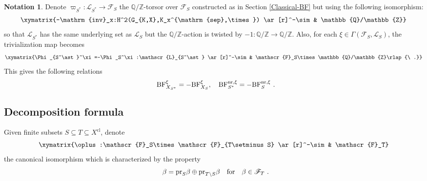 \documentclass[a4paper]{amsart}
\theoremstyle{definition}
\newtheorem{notation}[thm]{Notation}
\numberwithin{equation}{section}
\begin{document}
\begin{notation}\label{Bdy-reversed} Denote $\varpi_{S^\ast}:\mathscr{L}_{S^\ast}\rightarrow\mathscr{F}_S$ the $\mathbb{Q}/\mathbb{Z}$-torsor over $\mathscr{F}_S$ constructed as in Section \ref{Classical-BF} but using the following isomorphism:
\begin{align*}
    \xymatrix{-\mathrm{inv}_x:H^2(G_{K,X},K_x^{\mathrm{sep},\times}) \ar[r]^-\sim & \mathbb{Q}/\mathbb{Z}}
\end{align*}
so that $\mathscr{L}_{S^\ast}$ has the same underlying set as $\mathscr{L}_S$ but the $\mathbb{Q}/\mathbb{Z}$-action is twisted by $-1:\mathbb{Q}/\mathbb{Z}\rightarrow\mathbb{Q}/\mathbb{Z}$. Also, for each $\xi\in\Gamma(\mathscr{F}_S,\mathscr{L}_S)$, the trivialization map becomes
\begin{align*}
    \xymatrix{\Phi_{S^\ast}^\xi=-\Phi_S^\xi:\mathscr{L}_{S^\ast} \ar[r]^-\sim & \mathscr{F}_S\times\mathbb{Q}/\mathbb{Z}\rlap{\ .}}
\end{align*}
This gives the following relations
\begin{align*}
    \mathrm{BF}_{X_{S^\ast}}^\xi=-\mathrm{BF}_{X_S}^\xi,\quad\mathrm{BF}_{S^\ast}^{\mathrm{nr},\xi}=-\mathrm{BF}_S^{\mathrm{nr},\xi}\rlap{\ .}
\end{align*}
\end{notation}



\subsection{Decomposition formula} Given finite subsets $S\subseteq T\subseteq X^\mathrm{cl}$, denote
\begin{align*}
    \xymatrix{\oplus:\mathscr{F}_S\times\mathscr{F}_{T\setminus S} \ar[r]^-\sim & \mathscr{F}_T}
\end{align*}
the canonical isomorphism which is characterized by the property
\begin{align*}
    \beta=\mathrm{pr}_S\beta\oplus\mathrm{pr}_{T\setminus S}\beta\quad\textrm{for}\quad\beta\in\mathscr{F}_T\rlap{\ .}
\end{align*}
\end{document}
